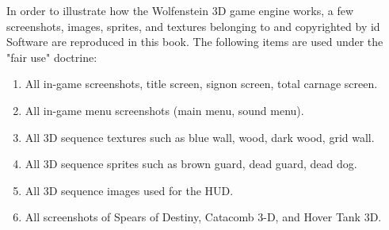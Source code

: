 In order to illustrate how the Wolfenstein 3D game engine works, a few screenshots, images, sprites, and textures belonging to and copyrighted by id Software are reproduced in this book. The following items are used under the "fair use" doctrine:\\
\par
\begin{enumerate}
	\item All in-game screenshots, title screen, signon screen, total carnage screen.
	\item All in-game menu screenshots (main menu, sound menu).
	\item All 3D sequence textures such as blue wall, wood, dark wood, grid wall.
    \item All 3D sequence sprites such as brown guard, dead guard, dead dog.
    \item All 3D sequence images used for the HUD.
    \item All screenshots of Spears of Destiny, Catacomb 3-D, and Hover Tank 3D.
\end{enumerate}
